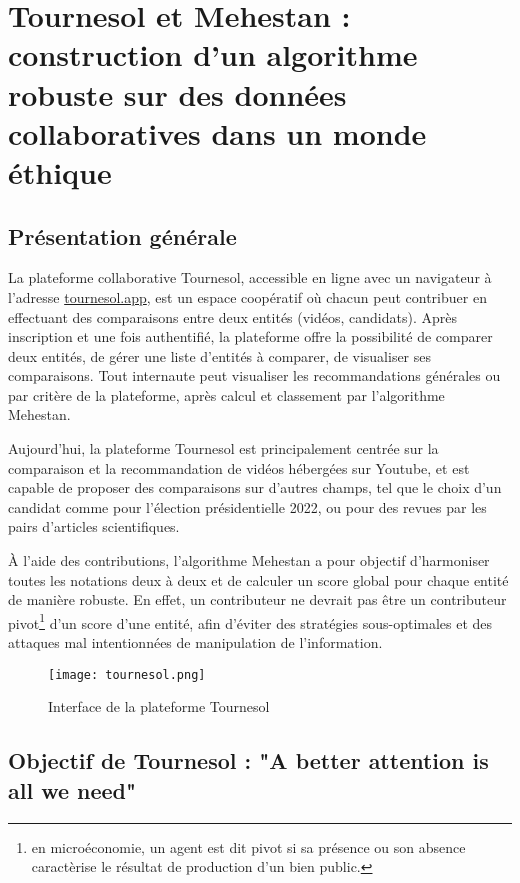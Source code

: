 \section{Tournesol et Mehestan : construction d'un algorithme robuste sur des données collaboratives dans un monde éthique}

\subsection{Présentation générale}

La plateforme collaborative Tournesol, accessible en ligne avec un navigateur à l'adresse
\href{https://tournesol.app}{tournesol.app}, est un espace coopératif où chacun peut contribuer en effectuant des comparaisons entre deux entités (vidéos, candidats). Après inscription et une fois authentifié, la plateforme offre la possibilité de comparer deux entités, de gérer une liste d'entités à comparer, de visualiser ses comparaisons. Tout internaute peut visualiser les recommandations générales ou par critère de la plateforme, après calcul et classement par l'algorithme Mehestan.

Aujourd'hui, la plateforme Tournesol est principalement centrée sur la comparaison et la recommandation de vidéos hébergées sur Youtube, et est capable de proposer des comparaisons sur d'autres champs, tel que le choix d'un candidat comme pour l'élection présidentielle 2022, ou pour des revues par les pairs d'articles scientifiques.


À l'aide des contributions, l'algorithme Mehestan a pour objectif d'harmoniser toutes les notations deux à deux et de calculer un score global pour chaque entité de manière robuste. En effet, un contributeur ne devrait pas être un contributeur pivot\footnote{en microéconomie, un agent est dit pivot si sa présence ou son absence caractèrise le résultat de production d'un bien public.} d'un score d'une entité, afin d'éviter des stratégies sous-optimales et des attaques mal intentionnées de manipulation de l'information.

\begin{figure}[ht]
  \texttt{[image: tournesol.png]}
  \caption{Interface de la plateforme Tournesol}
\end{figure}


\subsection{Objectif de Tournesol : "A better attention is all we need"}



